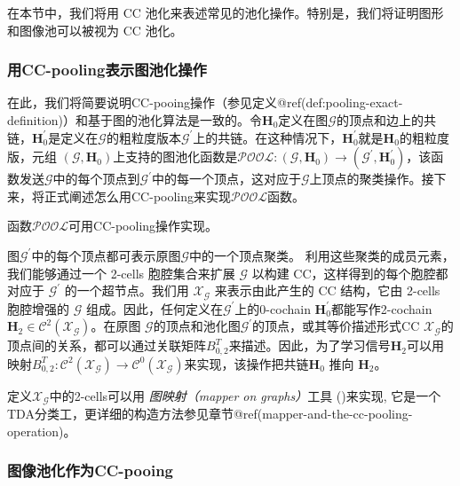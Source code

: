 \documentclass[
  12pt,
]{krantz}
\begin{document}
在本节中，我们将用 CC
池化来表述常见的池化操作。特别是，我们将证明图形和图像池可以被视为 CC
池化。

\subsubsection{用CC-pooling表示图池化操作}\label{graph-pooling-as-cc-pooling}

在此，我们将简要说明CC-pooing操作（参见定义@ref(def:pooling-exact-definition)）和基于图的池化算法是一致的。令\(\mathbf{H}_0\)定义在图\(\mathcal{G}\)的顶点和边上的共链，\(\mathbf{H}^{\prime}_0\)是定义在\(\mathcal{G}\)的粗粒度版本\(\mathcal{G}^{\prime }\)上的共链。在这种情况下，\(\mathbf{H}^{\prime}_0\)就是\(\mathbf{H}_0\)的粗粒度版，元组
\((\mathcal{G},\mathbf{H}_0)\)上支持的图池化函数是\(\mathcal{POOL} \colon (\mathcal{G},\mathbf{H}_0) \to (\mathcal{G}^{\prime},\mathbf{H}^{\prime}_0)\)，该函数发送\(\mathcal{G}\)中的每个顶点到\(\mathcal{G}^{\prime}\)中的每一个顶点，这对应于\(\mathcal{G}\)上顶点的聚类操作。接下来，将正式阐述怎么用CC-pooling来实现\(\mathcal{POOL}\)函数。

\label{pool}
函数\(\mathcal{POOL}\)可用CC-pooling操作实现。

图\(\mathcal{G}^{\prime}\)中的每个顶点都可表示原图\(\mathcal{G}\)中的一个顶点聚类。
利用这些聚类的成员元素，我们能够通过一个 2-cells 胞腔集合来扩展
\(\mathcal{G}\) 以构建 CC，这样得到的每个胞腔都对应于
\(\mathcal{G}^{\prime}\) 的一个超节点。我们用
\(\mathcal{X}_{\mathcal{G}}\) 来表示由此产生的 CC 结构，它由 2-cells
胞腔增强的 \(\mathcal{G}\)
组成。因此，任何定义在\(\mathcal{G}^{\prime}\)上的0-cochain
\(\mathbf{H}^{\prime}_0\)都能写作2-cochain
\(\mathbf{H}_2 \in \mathcal{C}^2(\mathcal{X}_{\mathcal{G}})\)。在原图
\(\mathcal{G}\)的顶点和池化图\(\mathcal{G}^{\prime}\)的顶点，或其等价描述形式CC
\(\mathcal{X}_{\mathcal{G}}\)的顶点间的关系，都可以通过关联矩阵\(B_{0,2}^T\)来描述。因此，为了学习信号\(\mathbf{H}_2\)可以用映射\(B_{0,2}^T \colon \mathcal{C}^{2} (\mathcal{X}_{\mathcal{G}}) \to \mathcal{C}^{0}(\mathcal{X}_{\mathcal{G}})\)来实现，该操作把共链\(\mathbf{H}_0\)
推向 \(\mathbf{H}_2\)。

定义\(\mathcal{X}_{\mathcal{G}}\)中的2-cells可以用 \emph{图映射（mapper
on graphs）}工具 ()来实现,
它是一个TDA分类工，更详细的构造方法参见章节@ref(mapper-and-the-cc-pooling-operation)。

\subsubsection{图像池化作为CC-pooing}\label{image-pooling-as-cc-pooling}
\end{document}
